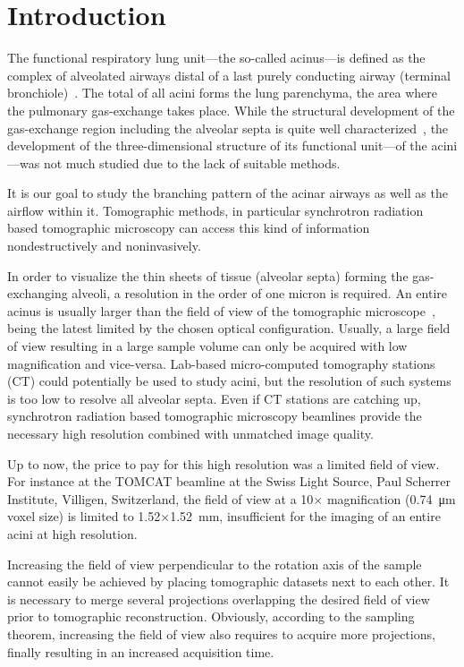 \documentclass[preprint,s]{iucr}
\begin{document}
\section{Introduction}

The functional respiratory lung unit---the so-called acinus---is defined as the complex of alveolated airways distal of a last purely conducting airway (terminal bronchiole)~\cite{Rodriguez1987}. The total of all acini forms the lung parenchyma, the area where the pulmonary gas-exchange takes place. While the structural development of the gas-exchange region including the alveolar septa is quite well characterized~\cite{Schittny2007a,Schittny2008,Mund2008}, the development of the three-dimensional structure of its functional unit---of the acini---was not much studied due to the lack of suitable methods. 

It is our goal to study the branching pattern of the acinar airways as well as the airflow within it. Tomographic methods, in particular synchrotron radiation based tomographic microscopy can access this kind of information nondestructively and noninvasively.

In order to visualize the thin sheets of tissue (alveolar septa) forming the gas-exchanging alveoli, a resolution in the order of one micron is required. An entire acinus is usually larger than the field of view of the tomographic microscope~\cite{Rodriguez1987}, being the latest limited by the chosen optical configuration. Usually, a large field of view resulting in a large sample volume can only be acquired with low magnification and vice-versa. Lab-based micro-computed tomography stations (\micro CT) could potentially be used to study acini, but the resolution of such systems is too low to resolve all alveolar septa. Even if \micro CT stations are catching up, synchrotron radiation based tomographic microscopy beamlines provide the necessary high resolution combined with unmatched image quality.

Up to now, the price to pay for this high resolution was a limited field of view. For instance at the TOMCAT beamline \cite{Stampanoni2007} at the Swiss Light Source, Paul Scherrer Institute, Villigen, Switzerland, the field of view at a 10$\times$ magnification (\SI{0.74}{\micro\meter} voxel size) is limited to 1.52$\times$\SI{1.52}{\milli\meter}, insufficient for the imaging of an entire acini at high resolution.

Increasing the field of view perpendicular to the rotation axis of the sample cannot easily be achieved by placing tomographic datasets next to each other. It is necessary to merge several projections overlapping the desired field of view prior to tomographic reconstruction. Obviously, according to the sampling theorem, increasing the field of view also requires to acquire more projections, finally resulting in an increased acquisition time.
\end{document}
